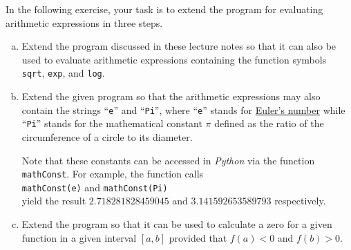 \exercise
In the following exercise, your task is to extend the program for evaluating arithmetic expressions in three steps.
\begin{enumerate}[(a)]
\item Extend the program discussed in these lecture notes so that it can also be used to evaluate
      arithmetic expressions containing the function symbols
      \\[0.2cm]
      \hspace*{1.3cm}
      \texttt{sqrt}, \texttt{exp}, and \texttt{log}.
\item Extend the given program so that the arithmetic expressions may also contain 
      the strings ``\texttt{e}'' and ``\texttt{Pi}'', where ``\texttt{e}'' stands for 
      \href{http://en.wikipedia.org/wiki/E_(mathematical_constant)}{Euler's number} 
      while ``\texttt{Pi}'' stands for the mathematical constant
      \href{http://en.wikipedia.org/wiki/Pi}{$\pi$} defined as the ratio of the circumference of a
      circle to its diameter. 

      Note that these constants can be accessed in \textsl{Python} via the function \texttt{mathConst}.
      For example, the function calls
      \\[0.2cm]
      \hspace*{1.3cm}
      \texttt{mathConst(e)} \quad and \quad
      \texttt{mathConst(Pi)} 
      \\[0.2cm]
      yield the result $2.718281828459045$ and $3.141592653589793$ respectively.
\item Extend the program so that it can be used to calculate a zero for a given function in a given
      interval $[a,b]$ provided that $f(a) < 0$ and $f(b) > 0$.  
      \eox
\end{enumerate}



